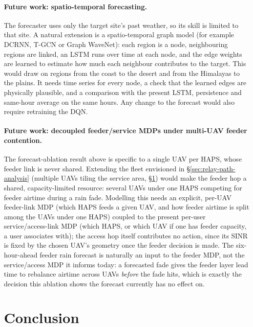 \documentclass[conference]{IEEEtran}
\begin{document}
\paragraph{Future work: spatio-temporal forecasting.} The forecaster uses only the target site's past weather, so its skill is limited to that site. A natural extension is a spatio-temporal graph model (for example DCRNN, T-GCN or Graph WaveNet): each region is a node, neighbouring regions are linked, an LSTM runs over time at each node, and the edge weights are learned to estimate how much each neighbour contributes to the target. This would draw on regions from the coast to the desert and from the Himalayas to the plains. It needs time series for every node, a check that the learned edges are physically plausible, and a comparison with the present LSTM, persistence and same-hour average on the same hours. Any change to the forecast would also require retraining the DQN.

\paragraph{Future work: decoupled feeder/service MDPs under multi-UAV feeder contention.} The forecast-ablation result above is specific to a single UAV per HAPS, whose feeder link is never shared. Extending the fleet envisioned in \S\ref{sec:relay-path-analysis} (multiple UAVs tiling the service area, \S\ref{sec:conclusion}) would make the feeder hop a shared, capacity-limited resource: several UAVs under one HAPS competing for feeder airtime during a rain fade. Modelling this needs an explicit, per-UAV feeder-link MDP (which HAPS feeds a given UAV, and how feeder airtime is split among the UAVs under one HAPS) coupled to the present per-user service/access-link MDP (which HAPS, or which UAV if one has feeder capacity, a user associates with); the access hop itself contributes no action, since its SINR is fixed by the chosen UAV's geometry once the feeder decision is made. The six-hour-ahead feeder rain forecast is naturally an input to the feeder MDP, not the service/access MDP it informs today: a forecasted fade gives the feeder layer lead time to rebalance airtime across UAVs \emph{before} the fade hits, which is exactly the decision this ablation shows the forecast currently has no effect on.

\section{Conclusion}
\label{sec:conclusion}
\end{document}
